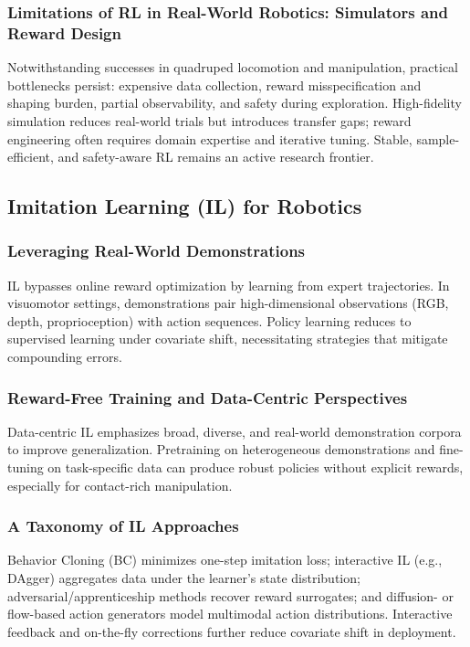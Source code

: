 \subsubsection{Limitations of RL in Real-World Robotics: Simulators and Reward Design}
Notwithstanding successes in quadruped locomotion and manipulation, practical bottlenecks persist: expensive data collection, reward misspecification and shaping burden, partial observability, and safety during exploration. High-fidelity simulation reduces real-world trials but introduces transfer gaps; reward engineering often requires domain expertise and iterative tuning. Stable, sample-efficient, and safety-aware RL remains an active research frontier.

\subsection{Imitation Learning (IL) for Robotics}
\subsubsection{Leveraging Real-World Demonstrations}
IL bypasses online reward optimization by learning from expert trajectories. In visuomotor settings, demonstrations pair high-dimensional observations (RGB, depth, proprioception) with action sequences. Policy learning reduces to supervised learning under covariate shift, necessitating strategies that mitigate compounding errors.

\subsubsection{Reward-Free Training and Data-Centric Perspectives}
Data-centric IL emphasizes broad, diverse, and real-world demonstration corpora to improve generalization. Pretraining on heterogeneous demonstrations and fine-tuning on task-specific data can produce robust policies without explicit rewards, especially for contact-rich manipulation.

\subsubsection{A Taxonomy of IL Approaches}
Behavior Cloning (BC) minimizes one-step imitation loss; interactive IL (e.g., DAgger) aggregates data under the learner’s state distribution; adversarial/apprenticeship methods recover reward surrogates; and diffusion- or flow-based action generators model multimodal action distributions. Interactive feedback and on-the-fly corrections further reduce covariate shift in deployment.